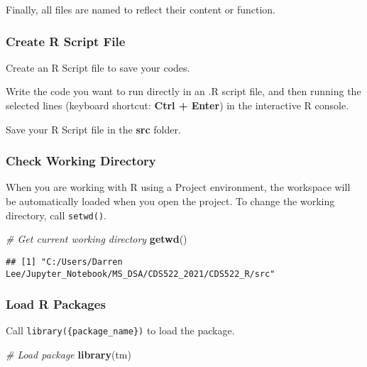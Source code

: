 \documentclass[
]{article}
\newenvironment{Shaded}{\begin{snugshade}}{\end{snugshade}}
\newcommand{\CommentTok}[1]{\textcolor[rgb]{0.56,0.35,0.01}{\textit{#1}}}
\newcommand{\KeywordTok}[1]{\textcolor[rgb]{0.13,0.29,0.53}{\textbf{#1}}}
\newcommand{\NormalTok}[1]{#1}
\begin{document}
Finally, all files are named to reflect their content or function.

\hypertarget{create-r-script-file}{%
\subsubsection{Create R Script File}\label{create-r-script-file}}

Create an R Script file to save your codes.

Write the code you want to run directly in an .R script file, and then
running the selected lines (keyboard shortcut: \textbf{Ctrl + Enter}) in
the interactive R console.

Save your R Script file in the \textbf{src} folder.

\hypertarget{check-working-directory}{%
\subsubsection{Check Working Directory}\label{check-working-directory}}

When you are working with R using a Project environment, the workspace
will be automatically loaded when you open the project. To change the
working directory, call \texttt{setwd()}.

\begin{Shaded}
\begin{Highlighting}[]
\CommentTok{# Get current working directory}
\KeywordTok{getwd}\NormalTok{()}
\end{Highlighting}
\end{Shaded}

\begin{verbatim}
## [1] "C:/Users/Darren Lee/Jupyter_Notebook/MS_DSA/CDS522_2021/CDS522_R/src"
\end{verbatim}

\hypertarget{load-r-packages}{%
\subsubsection{Load R Packages}\label{load-r-packages}}

Call \texttt{library(\{package\_name\})} to load the package.

\begin{Shaded}
\begin{Highlighting}[]
\CommentTok{# Load package}
\KeywordTok{library}\NormalTok{(tm)}
\end{Highlighting}
\end{Shaded}
\end{document}

